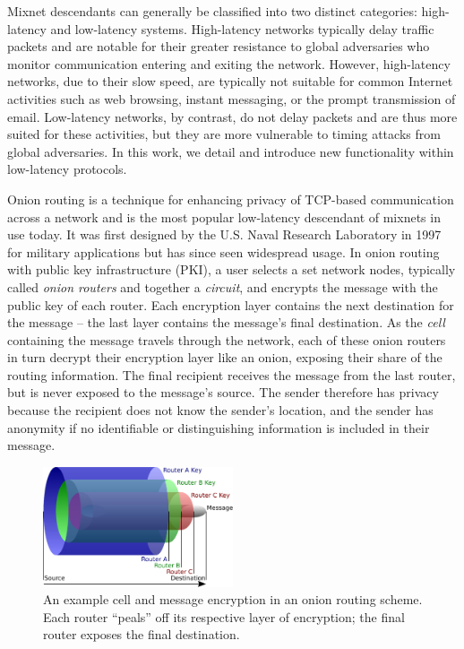 Mixnet descendants can generally be classified into two distinct categories: high-latency and low-latency systems. High-latency networks typically delay traffic packets and are notable for their greater resistance to global adversaries who monitor communication entering and exiting the network. However, high-latency networks, due to their slow speed, are typically not suitable for common Internet activities such as web browsing, instant messaging, or the prompt transmission of email. Low-latency networks, by contrast, do not delay packets and are thus more suited for these activities, but they are more vulnerable to timing attacks from global adversaries\cite{dingledine2004tor}. In this work, we detail and introduce new functionality within low-latency protocols.

Onion routing is a technique for enhancing privacy of TCP-based communication across a network and is the most popular low-latency descendant of mixnets in use today. It was first designed by the U.S. Naval Research Laboratory in 1997 for military applications\cite{syverson1997anonymous}\cite{reed1998anonymous} but has since seen widespread usage. In onion routing with public key infrastructure (PKI), a user selects a set network nodes, typically called \emph{onion routers} and together a \emph{circuit}, and encrypts the message with the public key of each router. Each encryption layer contains the next destination for the message -- the last layer contains the message's final destination. As the \emph{cell} containing the message travels through the network, each of these onion routers in turn decrypt their encryption layer like an onion, exposing their share of the routing information. The final recipient receives the message from the last router, but is never exposed to the message's source\cite{syverson2011peel}. The sender therefore has privacy because the recipient does not know the sender's location, and the sender has anonymity if no identifiable or distinguishing information is included in their message.

\begin{figure}[htbp]
	\centering
	\includegraphics[width=0.5\textwidth]{images/onion-diagram.eps}
	\caption{An example cell and message encryption in an onion routing scheme. Each router ``peals'' off its respective layer of encryption; the final router exposes the final destination.}
\end{figure}

